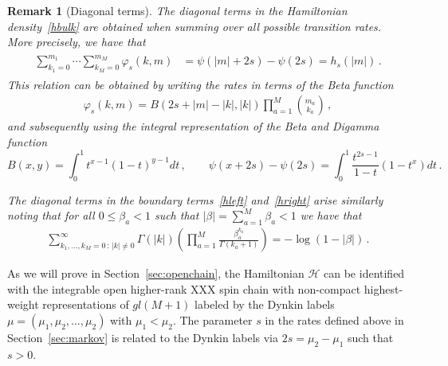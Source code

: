 \documentclass[11pt]{article}
\numberwithin{equation}{section}
\newtheorem{remark}[theorem]{Remark}
\newcommand{\mmu}{\mu}
\newcommand{\M}{M}
\newcommand{\eH}{\mathcal{H}}
\begin{document}
\begin{remark}[Diagonal terms]
 The diagonal terms in the Hamiltonian density~\eqref{hbulk} are obtained when summing over all possible transition rates.
More precisely, we have that
 \begin{align}\label{digamma-ratesBulk}
\begin{split}
 	\sum_{k_{1}=0}^{m_{1}}\cdots\sum_{k_{\M}=0}^{m_{\M}}\varphi_{s}(k,m)
 	&=\psi(|m|+2s)-\psi(2s)
    = h_{s}(|m|)\,.
 	\end{split}
 \end{align}
This relation can be obtained by writing the rates in terms of the Beta function
 \begin{align}\label{rates2}
	\varphi_{s}(k,m)=B(2s+|m|-|k|,|k|)\prod_{a=1}^{\M}\binom{m_a}{k_a}\,,
\end{align}
and subsequently using the integral representation of the Beta and Digamma function
\begin{equation}\label{eq:intrp}
 B(x,y)=\int_0^1 t^{x-1}(1-t)^{y-1}dt\,,\qquad  \psi(x+2s)-\psi(2s)=\int_0^1 \frac{t^{2s-1}}{1-t}(1-t^x) dt\,.
\end{equation}

The diagonal terms in the boundary terms~\eqref{hleft} and~\eqref{hright} arise similarly noting that  for all $0\leq \beta_{a}<1$ such that $|\beta|=\sum_{a=1}^{\M}\beta_{a} <1$ we have that
\begin{align}\label{log-rateBoundary}
	\sum_{k_{1},\ldots, k_{\M}=0\,:\,|k|\neq 0}^{\infty}\Gamma(|k|)\left(\prod_{a=1}^{\M}\frac{\beta_{a}^{k_{a}}}{\Gamma(k_{a}+1)}\right)=-\log\left(1-|\beta|\right)\,.
\end{align}
\end{remark}
As we will prove in Section~\ref{sec:openchain}, the Hamiltonian $\eH$ can be identified with the integrable open higher-rank XXX spin chain with non-compact highest-weight representations of $gl(M+1)$ labeled by the Dynkin labels $\mmu=(\mmu_1,\mmu_2,\ldots,\mmu_{2})$ with $\mmu_1<\mmu_2$. The parameter $s$ in the rates defined above in Section~\ref{sec:markov}  is related to the Dynkin labels via $2s=\mmu_2-\mmu_1$ such that $s>0$.
\end{document}

